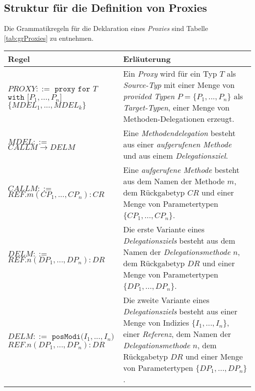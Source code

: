 \subsection{Struktur für die Definition von Proxies}\label{sec:proxygram}
Die Grammatikregeln für die Deklaration eines \emph{Proxies} sind Tabelle \ref{tab:grProxies} zu entnehmen.
\begin{table}[H]
\centering
\begin{tabular}{|p{5cm}|p{9cm}|}
\hline
\hline
\centering\textbf{Regel} & \textbf{Erläuterung} \\
\hline
\hline
$\mathit{PROXY} ::=$\newline
$\texttt{proxy } \texttt{for } T$\newline
$ \texttt{with [}\mathit{P_1},...,\mathit{P_n}\texttt{]}$ \newline
$\texttt{\{}\mathit{MDEL_1},...,\mathit{MDEL_k} \texttt{\}}$
 & Ein \emph{Proxy} wird für ein Typ $T$ als \emph{Source-Typ} mit einer Menge von \emph{provided Typen} $P = \{P_1,...,P_n\}$ als \emph{Target-Typen}, einer Menge von Methoden-Delegationen erzeugt.\\
\hline
$\mathit{MDEL} ::=$\newline
$CALLM \rightarrow DELM $  & Eine \emph{Methodendelegation} besteht aus einer \emph{aufgerufenen Methode} und aus einem \emph{Delegationsziel}.\\
\hline
$\mathit{CALLM} ::=$\newline 
$\mathit{REF}.\mathit{m(\mathit{CP_1},...,\mathit{CP_n}):CR} $  & Eine \emph{aufgerufene Methode} besteht aus dem Namen der Methode $m$, dem Rückgabetyp $\mathit{CR}$ und einer Menge von Parametertypen $\{\mathit{CP_1},...,\mathit{CP_n}\}$.\\
\hline
$\mathit{DELM} ::=$\newline 
$\mathit{REF}.\mathit{n(\mathit{DP_1},...,\mathit{DP_n}):DR} $  
& Die erste Variante eines \emph{Delegationsziels} besteht aus  dem Namen der \emph{Delegationsmethode} $n$, dem Rückgabetyp $\mathit{DR}$ und einer Menge von Parametertypen $\{\mathit{DP_1},...,\mathit{DP_n}\}$.\\
\hline
$\mathit{DELM} ::=$\newline
$\texttt{posModi(} \mathit{I_1},...,\mathit{I_n} \texttt{)}$\newline
$\mathit{REF}.\mathit{n(\mathit{DP_1},...,\mathit{DP_n}):DR} $  
& Die zweite Variante eines \emph{Delegationsziels} besteht aus einer Menge von Indizies $\{\mathit{I_1},...,\mathit{I_n}\}$, einer \emph{Referenz}, dem Namen der \emph{Delegationsmethode} $n$, dem Rückgabetyp $\mathit{DR}$ und einer Menge von Parametertypen $\{\mathit{DP_1},...,\mathit{DP_n}\}$.\\

\end{tabular}
\end{table}

